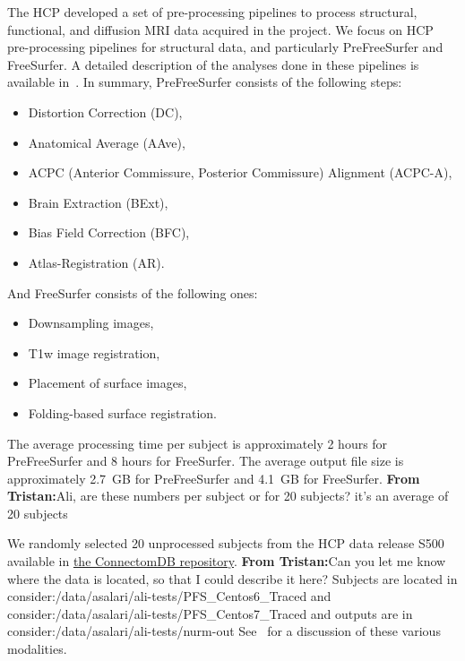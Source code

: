 \documentclass[a4paper,num-refs]{oup-contemporary}
\newcommand{\tristan}[1]{\color{blue}\textbf{From Tristan:}#1\color{black}}
\begin{document}
The HCP developed a set of pre-processing pipelines to process structural,
functional, and diffusion MRI data acquired in the project. We focus on HCP
pre-processing pipelines for structural data, and particularly
PreFreeSurfer and FreeSurfer. 
A detailed description of the analyses done in these
pipelines is available in~\cite{glasser2013}. 
In summary, PreFreeSurfer consists of the following steps: 
\begin{itemize}
\item Distortion Correction (DC), 
\item Anatomical Average (AAve), 
\item ACPC (Anterior Commissure, Posterior Commissure) Alignment (ACPC-A), 
\item Brain Extraction (BExt), 
\item Bias Field Correction (BFC), 
\item Atlas-Registration (AR).
\end{itemize}
And FreeSurfer consists of the following ones:
\begin{itemize}
\item Downsampling images, 
\item T1w image registration, 
\item Placement of surface images, 
\item Folding-based surface registration.
\end{itemize}
The average processing time per subject is approximately 2 hours for
PreFreeSurfer and 8 hours for FreeSurfer. The average output file size is
approximately 2.7~GB for PreFreeSurfer and 4.1~GB for FreeSurfer.
\tristan{Ali, are these numbers per subject or for 20 subjects? it's an average of 20 subjects}

We randomly selected 20 unprocessed subjects 
from the HCP data release S500 
available in \href{https://db.humanconnectome.org}{the ConnectomDB repository}. 
\tristan{Can you let me know where the data is located, so that I could describe it here?
Subjects are located in consider:/data/asalari/ali-tests/PFS\_Centos6\_Traced
and consider:/data/asalari/ali-tests/PFS\_Centos7\_Traced 
and outputs are in consider:/data/asalari/ali-tests/nurm-out}
See~\cite{van2013wu} for a discussion of these various modalities.

\end{document}
